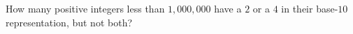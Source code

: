 How many positive integers less than $1{,}000{,}000$ have a $2$ or a $4$ in their base-$10$ representation, but not both?
